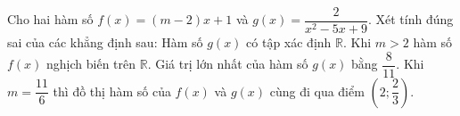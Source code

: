 \begin{ex}
Cho hai hàm số $f(x)=(m-2)x+1$ và $g(x)=\dfrac{2}{x^2-5x+9}$. Xét tính đúng sai của các khẳng định sau:
\choiceTF
{\True Hàm số $g(x)$ có tập xác định $\mathbb R$.}
{Khi $m>2$ hàm số $f(x)$ nghịch biến trên $\mathbb R$.}
{\True Giá trị lớn nhất của hàm số $g(x)$ bằng $\dfrac{8}{11}$.}
{\True Khi $m=\dfrac{11}{6}$ thì đồ thị hàm số của $f(x)$ và $g(x)$ cùng đi qua điểm $\left(2;\dfrac23\right)$.}
\end{ex}

